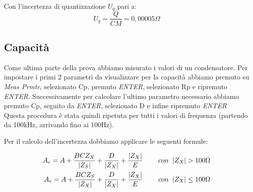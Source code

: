 Con l'incertezza di quantizzazione $U_q$ pari a:
\begin{equation}
    U_q = \frac{Q}{CM} = 0,00005 \Omega
\end{equation}



\subsection{Capacità}
\label{sub:c}
Come ultima parte della prova abbiamo misurato i valori di un condensatore.
Per impostare i primi 2 parametri da visualizzare per la capacità abbiamo premuto su \emph{Meas Prmtr}, selezionato Cp, premuto \emph{ENTER}, selezionato Rp e ripremuto \emph{ENTER}. Successivamente per calcolare l'ultimo parametro necessario abbiamo premuto Cp, seguito da \emph{ENTER}, selezionato D e infine ripremuto \emph{ENTER}
Questa procedura è stata quindi ripetuta per tutti i valori di frequenza (partendo da 100kHz, arrivando fino ai 100Hz).


\begin{table}[ht]
\centering
{}
\caption{LCR, misura della capacità}
\label{tab:lcr_c}
\end{table}
\FloatBarrier

Per il calcolo dell’incertezza dobbiamo applicare le seguenti formule:

\begin{equation}
\begin{split}
        A_e = A + \frac{BCZ_X}{|Z_S|} + \frac{D}{|Z_X|} + \frac{|Z_X|}{E} \hspace{0,8cm} con \hspace{0,2cm} |Z_X| > 100\Omega \\
        A_e = A + \frac{BCZ_S}{|Z_X|} + \frac{D}{|Z_X|} + \frac{|Z_X|}{E} \hspace{0,8cm} con \hspace{0,2cm} |Z_X| \leq 100\Omega
\end{split}
\end{equation}

